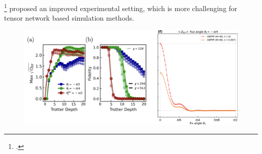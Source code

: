 \documentclass[10pt]{beamer}
\begin{document}
\begin{CJK}{UTF8}{gbsn}
\begin{frame}
  \cite{anand2023classical}\footcite{anand2023classical} proposed an improved experimental setting, which is more challenging for tensor network based simulation methods. 
  \begin{figure}
    \centering
    \includegraphics[width=\textwidth]{fig/simibm3.png}
  \end{figure}
\end{frame}


\end{CJK}
\end{document}
